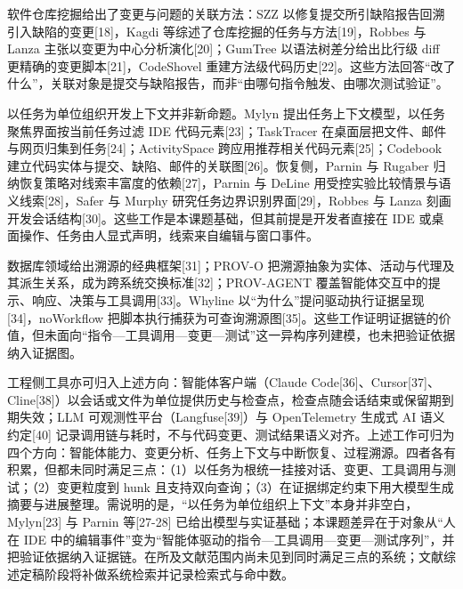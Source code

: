 软件仓库挖掘给出了变更与问题的关联方法：SZZ 以修复提交所引缺陷报告回溯引入缺陷的变更[18]，Kagdi 等综述了仓库挖掘的任务与方法[19]，Robbes 与 Lanza 主张以变更为中心分析演化[20]；GumTree 以语法树差分给出比行级 diff 更精确的变更脚本[21]，CodeShovel 重建方法级代码历史[22]。这些方法回答“改了什么”，关联对象是提交与缺陷报告，而非“由哪句指令触发、由哪次测试验证”。


以任务为单位组织开发上下文并非新命题。Mylyn 提出任务上下文模型，以任务聚焦界面按当前任务过滤 IDE 代码元素[23]；TaskTracer 在桌面层把文件、邮件与网页归集到任务[24]；ActivitySpace 跨应用推荐相关代码元素[25]；Codebook 建立代码实体与提交、缺陷、邮件的关联图[26]。恢复侧，Parnin 与 Rugaber 归纳恢复策略对线索丰富度的依赖[27]，Parnin 与 DeLine 用受控实验比较情景与语义线索[28]，Safer 与 Murphy 研究任务边界识别界面[29]，Robbes 与 Lanza 刻画开发会话结构[30]。这些工作是本课题基础，但其前提是开发者直接在 IDE 或桌面操作、任务由人显式声明，线索来自编辑与窗口事件。


数据库领域给出溯源的经典框架[31]；PROV-O 把溯源抽象为实体、活动与代理及其派生关系，成为跨系统交换标准[32]；PROV-AGENT 覆盖智能体交互中的提示、响应、决策与工具调用[33]。Whyline 以“为什么”提问驱动执行证据呈现[34]，noWorkflow 把脚本执行捕获为可查询溯源图[35]。这些工作证明证据链的价值，但未面向“指令—工具调用—变更—测试”这一异构序列建模，也未把验证依据纳入证据图。


工程侧工具亦可归入上述方向：智能体客户端（Claude Code[36]、Cursor[37]、Cline[38]）以会话或文件为单位提供历史与检查点，检查点随会话结束或保留期到期失效；LLM 可观测性平台（Langfuse[39]）与 OpenTelemetry 生成式 AI 语义约定[40] 记录调用链与耗时，不与代码变更、测试结果语义对齐。上述工作可归为四个方向：智能体能力、变更分析、任务上下文与中断恢复、过程溯源。四者各有积累，但都未同时满足三点：（1）以任务为根统一挂接对话、变更、工具调用与测试；（2）变更粒度到 hunk 且支持双向查询；（3）在证据绑定约束下用大模型生成摘要与进展整理。需说明的是，“以任务为单位组织上下文”本身并非空白，Mylyn[23] 与 Parnin 等[27-28] 已给出模型与实证基础；本课题差异在于对象从“人在 IDE 中的编辑事件”变为“智能体驱动的指令—工具调用—变更—测试序列”，并把验证依据纳入证据链。在所及文献范围内尚未见到同时满足三点的系统；文献综述定稿阶段将补做系统检索并记录检索式与命中数。


